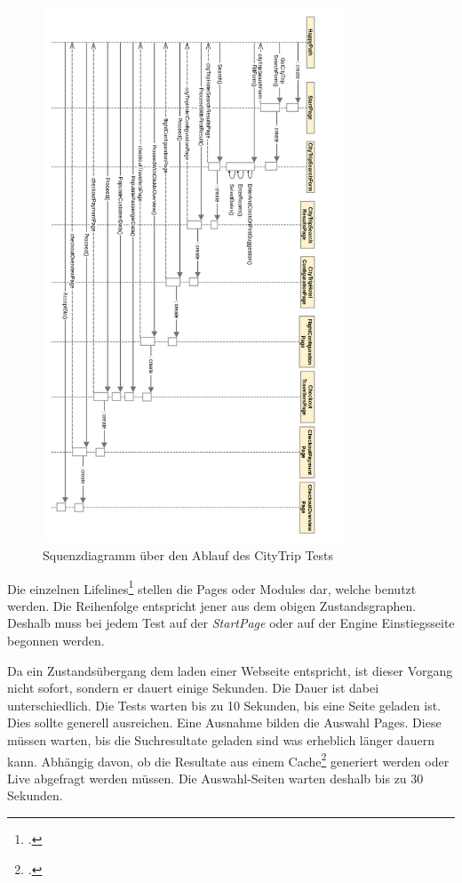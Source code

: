 \begin{figure}[H]
	\centering
	\includegraphics[width=0.8\textwidth]{images/Semesterarbeit - Sequenzdiagramm - HappyPath CityTrip - Portrait.png}
	\caption{Squenzdiagramm über den Ablauf des CityTrip Tests}
	\label{fig:umsetzung:zustandsgraph:sequenz}
\end{figure}

Die einzelnen Lifelines\footcite{sequence_diagram} stellen die Pages oder Modules dar, welche benutzt werden. Die Reihenfolge entspricht jener aus dem obigen Zustandsgraphen. Deshalb muss bei jedem Test auf der \textit{StartPage} oder auf der Engine Einstiegsseite begonnen werden.

Da ein Zustandsübergang dem laden einer Webseite entspricht, ist dieser Vorgang nicht sofort, sondern er dauert einige Sekunden. Die Dauer ist dabei unterschiedlich. Die Tests warten bis zu 10 Sekunden, bis eine Seite geladen ist. Dies sollte generell ausreichen. Eine Ausnahme bilden die Auswahl Pages. Diese müssen warten, bis die Suchresultate geladen sind was erheblich länger dauern kann. Abhängig davon, ob die Resultate aus einem Cache\footcite{Cache} generiert werden oder Live abgefragt werden müssen. Die Auswahl-Seiten warten deshalb bis zu 30 Sekunden.

